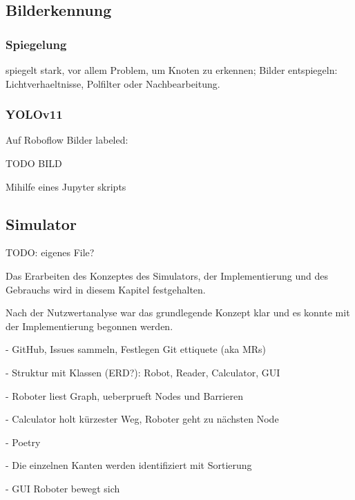 \subsection{Bilderkennung}

\subsubsection{Spiegelung}

spiegelt stark, vor allem Problem, um Knoten zu erkennen; Bilder entspiegeln: Lichtverhaeltnisse, Polfilter oder Nachbearbeitung.\cite{avoid-reflection}

\subsubsection{YOLOv11}

Auf Roboflow Bilder labeled:

TODO BILD

Mihilfe eines Jupyter skripts 

\subsection{Simulator}

TODO: eigenes File?

Das Erarbeiten des Konzeptes des Simulators, der Implementierung und des Gebrauchs wird in diesem Kapitel festgehalten.

Nach der Nutzwertanalyse war das grundlegende Konzept klar und es konnte mit der Implementierung begonnen werden.

- GitHub, Issues sammeln, Festlegen Git ettiquete (aka MRs)

- Struktur mit Klassen (ERD?): Robot, Reader, Calculator, GUI

- Roboter liest Graph, ueberprueft Nodes und Barrieren

- Calculator holt kürzester Weg, Roboter geht zu nächsten Node

- Poetry

- Die einzelnen Kanten werden identifiziert mit Sortierung

- GUI Roboter bewegt sich
